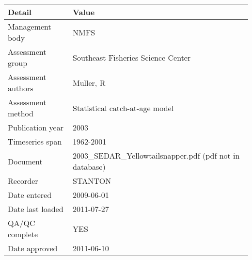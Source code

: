 \begin{table}[htb]
\centering
\begin{tabular}{lp{7cm}}
\toprule
Detail & Value \\
\midrule
Management body    & NMFS                                                     \\
Assessment group   & Southeast Fisheries Science Center                       \\
Assessment authors & Muller, R                                                \\
Assessment method  & Statistical catch-at-age model                           \\
Publication year   & 2003                                                     \\
Timeseries span    & 1962-2001                                                \\
Document           & 2003\_SEDAR\_Yellowtailsnapper.pdf (pdf not in database) \\
Recorder           & STANTON                                                  \\
Date entered       & 2009-06-01                                               \\
Date last loaded   & 2011-07-27                                               \\
QA/QC complete     & YES                                                      \\
Date approved      & 2011-06-10                                               \\
\bottomrule
\end{tabular}
\label{tab:assessdet}
\end{table}
